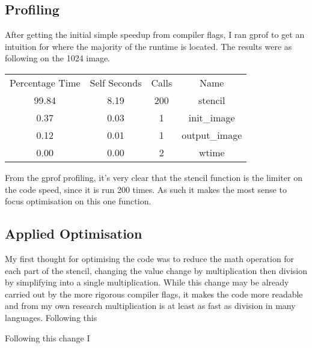 \documentclass{article}
\begin{document}
    \subsection{Profiling}
    After getting the initial simple speedup from compiler flags, I ran gprof to get an intuition for where the majority of the runtime is located.
    The results were as following on the 1024 image.
    \begin{center}
    \begin{tabular}{ c c c c }
    Percentage Time & Self Seconds & Calls & Name \\
    99.84 & 8.19 & 200 & stencil \\
    0.37 & 0.03 & 1 & init\_image \\
    0.12 & 0.01 & 1 & output\_image \\
    0.00 & 0.00 & 2 & wtime
    \end{tabular}
    \end{center}
    From the gprof profiling, it's very clear that the stencil function is the limiter on the code speed, since it is run 200 times. As such
    it makes the most sense to focus optimisation on this one function.
    \subsection{Applied Optimisation}
    My first thought for optimising the code was to reduce the math operation for each part of the stencil, changing the value change by multiplication 
    then division by simplifying into a single multiplication. While this change may be already carried out by the more rigorous compiler flags, it makes
    the code more readable and from my own research multiplication is at least as fast as division in many languages.
    Following this 
    
    Following this change I 
    
\end{document}
